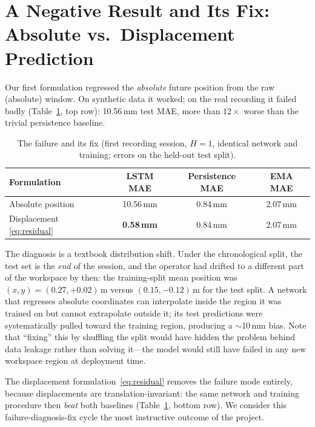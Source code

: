 \documentclass[11pt,a4paper]{article}
\begin{document}
\section{A Negative Result and Its Fix: Absolute vs.\ Displacement Prediction}
\label{sec:failure}

Our first formulation regressed the \emph{absolute} future position from the
raw (absolute) window. On synthetic data it worked; on the real recording it
failed badly (Table~\ref{tab:failure}, top row): 10.56\,mm test MAE, more than
$12\times$ worse than the trivial persistence baseline.

\begin{table}[t]
  \centering
  \caption{The failure and its fix (first recording session, $H{=}1$,
           identical network and training; errors on the held-out test split).}
  \label{tab:failure}
  \begin{tabular}{lccc}
    \toprule
    Formulation & LSTM MAE & Persistence MAE & EMA MAE \\
    \midrule
    Absolute position      & 10.56\,mm & 0.84\,mm & 2.07\,mm \\
    Displacement \eqref{eq:residual} & \textbf{0.58\,mm} & 0.84\,mm & 2.07\,mm \\
    \bottomrule
  \end{tabular}
\end{table}

The diagnosis is a textbook distribution shift. Under the chronological split,
the test set is the \emph{end} of the session, and the operator had drifted to
a different part of the workspace by then: the training-split mean position
was $(x,y) = (0.27, +0.02)$\,m versus $(0.15, -0.12)$\,m for the test split.
A network that regresses absolute coordinates can interpolate inside the
region it was trained on but cannot extrapolate outside it; its test
predictions were systematically pulled toward the training region, producing a
$\sim$10\,mm bias. Note that ``fixing'' this by shuffling the split would have
hidden the problem behind data leakage rather than solving it---the model
would still have failed in any new workspace region at deployment time.

The displacement formulation~\eqref{eq:residual} removes the failure mode
entirely, because displacements are translation-invariant: the same network
and training procedure then \emph{beat} both baselines (Table~\ref{tab:failure},
bottom row). We consider this failure-diagnosis-fix cycle the most instructive
outcome of the project.
\end{document}
